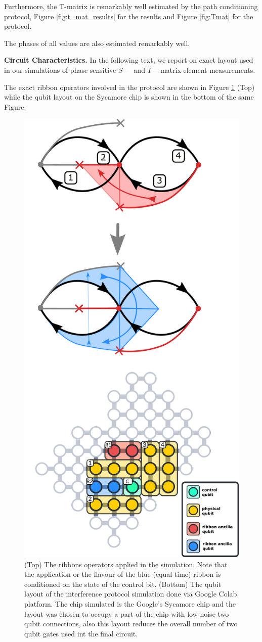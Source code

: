 \documentclass[two column]{article}
\begin{document}
Furthermore, the T-matrix is remarkably well estimated by the path conditioning protocol, Figure \ref{fig:t_mat_results} for the results and Figure \ref{fig:Tmat} for the protocol.

The phases of all values are also estimated remarkably well.

\textbf{Circuit Characteristics.}
In the following text, we report on exact layout used in our simulations of phase sensitive $S-$ and $T-$matrix element measurements.

The exact ribbon operators involved in the protocol are shown in Figure \ref{fig:intef_setup} (Top) while the qubit layout on the Sycamore chip is shown in the bottom of the same Figure.
\begin{figure}
	\centering
	\includegraphics[width=0.75\linewidth]{Figures/intef_setup_new.pdf}
	\caption{(Top) The ribbons operators applied in the simulation. Note that the application or the flavour of the blue (equal-time) ribbon is conditioned on the state of the control bit.  (Bottom) The qubit layout of the interference protocol simulation done via Google Colab platform. The chip simulated is the Google's Sycamore chip and the layout was chosen to occupy a part of the chip with low noise two qubit connections, also this layout reduces the overall number of two qubit gates used int the final circuit.}
	\label{fig:intef_setup}
\end{figure}
\end{document}
